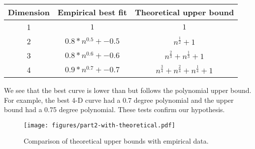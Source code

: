 \begin{tabular}{|c|c|c|}
\hline
Dimension&Empirical best fit&Theoretical upper bound\\
\hline
1&$1$&$1$\\
2&$0.8*n^{0.5} + -0.5$&$n^{\frac{1}{2}} + 1$\\
3&$0.8*n^{0.6} + -0.6$&$n^{\frac{2}{3}} + n^{\frac{1}{3}} + 1$\\
4&$0.9*n^{0.7} + -0.7$&$n^{\frac{3}{4}} + n^{\frac{2}{4}} + n^{\frac{1}{4}} + 1$\\
\hline
\end{tabular}

We see that the best curve is lower than but follows the polynomial upper
bound. For example, the best 4-D curve had a 0.7 degree polynomial and the
upper bound had a 0.75 degree polynomial. These tests confirm our
hypothesis.

\begin{figure}[htb!]
\centering
\texttt{[image: figures/part2-with-theoretical.pdf]}
\caption{Comparison of theoretical upper bounds with empirical data.}
\label{fig:part2-with-theoretical}
\end{figure}
